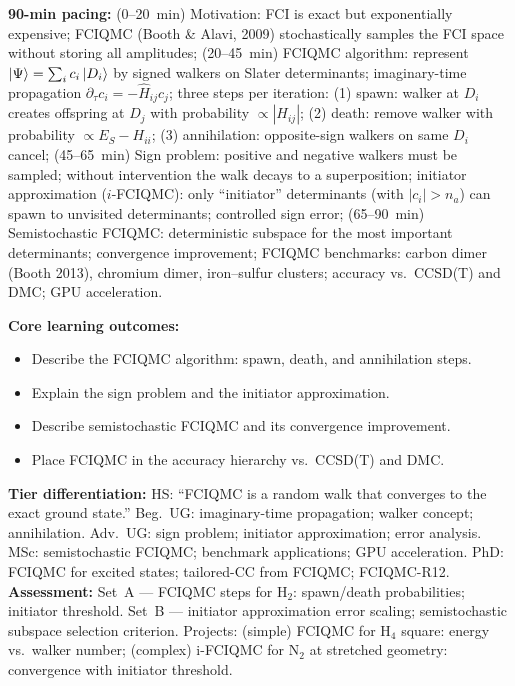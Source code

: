 \documentclass[11pt,a4paper]{article}
\begin{document}
\begin{tcolorbox}[chembox, title={Module~III.3 --- Lecture L10: Full CI Quantum Monte Carlo (FCIQMC)}]
\textbf{90-min pacing:} (0--20~min) Motivation: FCI is exact but exponentially expensive; FCIQMC (Booth \& Alavi, 2009) stochastically samples the FCI space without storing all amplitudes; (20--45~min) FCIQMC algorithm: represent $\ket{\Psi}=\sum_i c_i\ket{D_i}$ by signed walkers on Slater determinants; imaginary-time propagation $\partial_\tau c_i=-\hat{H}_{ij}c_j$; three steps per iteration: (1) spawn: walker at $D_i$ creates offspring at $D_j$ with probability $\propto|H_{ij}|$; (2) death: remove walker with probability $\propto E_S-H_{ii}$; (3) annihilation: opposite-sign walkers on same $D_i$ cancel; (45--65~min) Sign problem: positive and negative walkers must be sampled; without intervention the walk decays to a superposition; initiator approximation ($i$-FCIQMC): only ``initiator'' determinants (with $|c_i|>n_a$) can spawn to unvisited determinants; controlled sign error; (65--90~min) Semistochastic FCIQMC: deterministic subspace for the most important determinants; convergence improvement; FCIQMC benchmarks: carbon dimer (Booth 2013), chromium dimer, iron--sulfur clusters; accuracy vs.\ CCSD(T) and DMC; GPU acceleration.

\medskip\textbf{Core learning outcomes:}
\begin{itemize}[leftmargin=1.4em,topsep=2pt,itemsep=1pt]
  \item Describe the FCIQMC algorithm: spawn, death, and annihilation steps.
  \item Explain the sign problem and the initiator approximation.
  \item Describe semistochastic FCIQMC and its convergence improvement.
  \item Place FCIQMC in the accuracy hierarchy vs.\ CCSD(T) and DMC.
\end{itemize}
\medskip\textbf{Tier differentiation:}
HS: ``FCIQMC is a random walk that converges to the exact ground state.''
Beg.\ UG: imaginary-time propagation; walker concept; annihilation.
Adv.\ UG: sign problem; initiator approximation; error analysis.
MSc: semistochastic FCIQMC; benchmark applications; GPU acceleration.
PhD: FCIQMC for excited states; tailored-CC from FCIQMC; FCIQMC-R12.
\medskip\textbf{Assessment:}
Set~A --- FCIQMC steps for H$_2$: spawn/death probabilities; initiator threshold.
Set~B --- initiator approximation error scaling; semistochastic subspace selection criterion.
Projects: (simple) FCIQMC for H$_4$ square: energy vs.\ walker number; (complex) i-FCIQMC for N$_2$ at stretched geometry: convergence with initiator threshold.
\end{tcolorbox}
\end{document}
